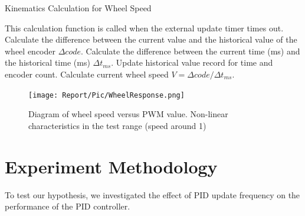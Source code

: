 \documentclass[conference]{IEEEtran}
\begin{document}
\begin{algorithm}
	\caption{Kinematics Calculation for Wheel Speed}\label{KinematicsAlgorithm}
	\begin{algorithmic}[1]
        \State This calculation function is called when the external update timer times out.
        \State Calculate the difference between the current value and the historical value of the wheel encoder $\Delta code$.
        \State Calculate the difference between the current time (ms) and the historical time (ms) $\Delta t_{ms}$.
        \State Update historical value record for time and encoder count.
        \State Calculate current wheel speed $V = \Delta code / \Delta t_{ms}$.
	\end{algorithmic} 
\end{algorithm}

\begin{figure}[htbp]
\centerline{\texttt{[image: Report/Pic/WheelResponse.png]}}
\caption{Diagram of wheel speed versus PWM value. Non-linear characteristics in the test range (speed around 1)} %
\label{fig_WheelCharacter}
\end{figure}



\section{Experiment Methodology}
\label{Experiment Methodology}

To test our hypothesis, we investigated the effect of PID update frequency on the performance of the PID controller.

% 
\end{document}
